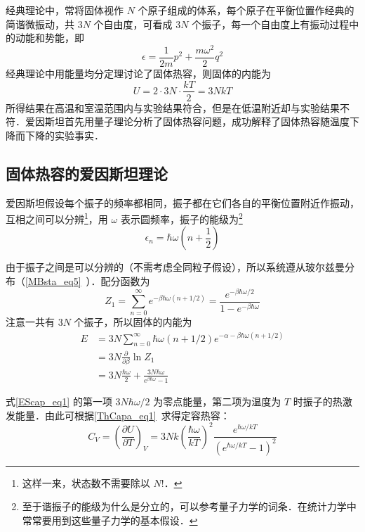 

经典理论中，常将固体视作 $N$ 个原子组成的体系，每个原子在平衡位置作经典的简谐微振动，共 $3N$ 个自由度，可看成 $3N$ 个振子，每一个自由度上有振动过程中的动能和势能，即
\begin{equation}
\epsilon=\frac{1}{2m}p^2+\frac{m\omega^2}{2}q^2
\end{equation}
经典理论中用能量均分定理讨论了固体热容，则固体的内能为
\begin{equation}
U=2\cdot 3N\cdot \frac{kT}{2}=3NkT
\end{equation}
所得结果在高温和室温范围内与实验结果符合，但是在低温附近却与实验结果不符．爱因斯坦首先用量子理论分析了固体热容问题，成功解释了固体热容随温度下降而下降的实验事实．

\subsection{固体热容的爱因斯坦理论}
爱因斯坦假设每个振子的频率都相同，振子都在它们各自的平衡位置附近作振动，互相之间可以分辨\footnote{这样一来，状态数不需要除以 $N!$．}，用 $\omega$ 表示圆频率，振子的能级为\footnote{至于谐振子的能级为什么是分立的，可以参考量子力学的词条．在统计力学中常常要用到这些量子力学的基本假设．}
\begin{equation}
\epsilon_n=\hbar \omega\left(n+\frac{1}{2}\right)
\end{equation}

由于振子之间是可以分辨的（不需考虑全同粒子假设），所以系统遵从玻尔兹曼分布（\autoref{MBsta_eq5}~）．配分函数为
\begin{equation}
Z_1=\sum_{n=0}^\infty e^{-\beta \hbar \omega(n+1/2)}=\frac{e^{-\beta\hbar \omega/2}}{1-e^{-\beta\hbar\omega}}
\end{equation}
注意一共有 $3N$ 个振子，所以固体的内能为
\begin{equation}\label{EScap_eq1}
\begin{aligned}
E&=3N\sum_{n=0}^\infty \hbar\omega(n+1/2)e^{-\alpha-\beta\hbar\omega(n+1/2)}\\
&=3N\frac{\partial }{\partial \beta}\ln Z_1\\
&=3N\frac{\hbar \omega}{2}+\frac{3N\hbar \omega}{e^{\beta\hbar\omega}-1}
\end{aligned}
\end{equation}

式\autoref{EScap_eq1} 的第一项 $3N \hbar\omega/2$ 为零点能量，第二项为温度为 $T$ 时振子的热激发能量．由此可根据\autoref{ThCapa_eq1}~求得定容热容：
\begin{equation}
C_V=\left(\frac{\partial U}{\partial T}\right)_V=3Nk\left(\frac{\hbar \omega}{kT}\right)^2\frac{e^{\hbar \omega/kT}}{(e^{\hbar \omega/kT}-1)^2}
\end{equation}

